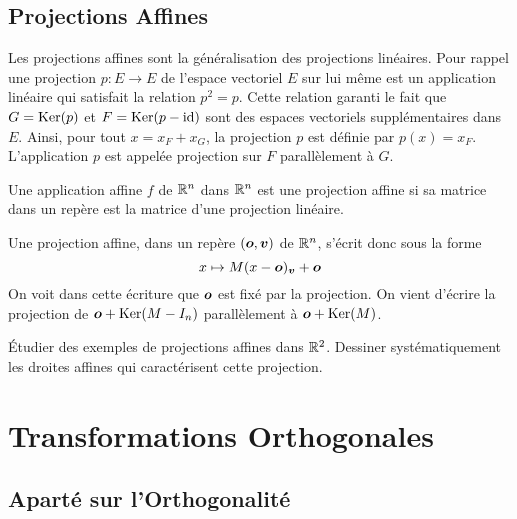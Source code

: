 \documentclass[11pt, a4paper]{article}
\begin{document}
\subsection{Projections Affines}

Les projections affines sont la généralisation des projections
linéaires. Pour rappel une projection $p : E \rightarrow E$ de
l'espace vectoriel $E$ sur lui même est un application linéaire qui
satisfait la relation $p^2 = p$. Cette relation garanti le fait que
$G = \operatorname{Ker}(p)$ et $F = \operatorname{Ker}(p-\mathrm{id})$ sont des espaces vectoriels
supplémentaires dans $E$. Ainsi, pour tout $x = x_F + x_G$, la
projection $p$ est définie par $p(x) = x_F$. L'application $p$ est
appelée projection sur $F$ parallèlement à $G$.
\begin{defn}
  Une application affine $f$ de $\mathbb{R}^n$ dans $\mathbb{R}^n$ est une projection
  affine si sa matrice dans un repère est la matrice d'une projection
  linéaire.
\end{defn}
\noindent Une projection affine, dans un repère $(\boldsymbol{o}, \boldsymbol{v})$ de
$\mathbb{R}^n$, s'écrit donc sous la forme
\[
x \mapsto M(x - \boldsymbol{o})_{\boldsymbol{v}} + \boldsymbol{o}
\]
On voit dans cette écriture que $\boldsymbol{o}$ est fixé par la
projection. On vient d'écrire la projection de $\boldsymbol{o} + \operatorname{Ker}(M-I_n)$
parallèlement à $\boldsymbol{o} + \operatorname{Ker}(M)$.
\begin{question}
  Étudier des exemples de projections affines dans $\mathbb{R}^2$. Dessiner
  systématiquement les droites affines qui caractérisent cette
  projection.
\end{question}

\section{Transformations Orthogonales}

\subsection{Aparté sur l'Orthogonalité}
\end{document}
